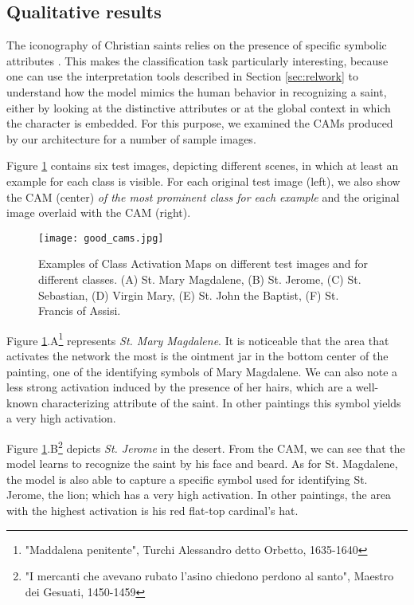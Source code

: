\documentclass[acmlarge]{acmart}
\begin{document}
\subsection{Qualitative results} \label{sec:qualitative}

The iconography of Christian saints relies on the presence of specific symbolic attributes \cite{Lanzi04}. This makes the classification task particularly interesting, because one can use the interpretation tools described in Section \ref{sec:relwork} to understand how the model mimics the human behavior in recognizing a saint, either by looking at the distinctive attributes or at the global context in which the character is embedded. For this purpose, we examined the CAMs produced by our architecture for a number of sample images.

Figure \ref{figure:good_cams} contains six test images, depicting different scenes, in which at least an example for each class is visible. For each original test image (left), we also show the CAM (center) \textit{of the most prominent class for each example} and the original image overlaid with the CAM (right). 

\begin{figure}[ht]
\texttt{[image: good\_cams.jpg]}
\centering
\caption{Examples of Class Activation Maps on different test images and for different classes. (A) St. Mary Magdalene, (B) St. Jerome, (C) St. Sebastian, (D) Virgin Mary, (E) St. John the Baptist, (F) St. Francis of Assisi.}
\label{figure:good_cams}
\end{figure}

Figure \ref{figure:good_cams}.A\footnote{"Maddalena penitente", Turchi Alessandro detto Orbetto, 1635-1640} represents \textit{St. Mary Magdalene}. It is noticeable that the area that activates the network  the most is the ointment jar in the bottom center of the painting,  one of the identifying symbols of Mary Magdalene. We can also note  a less strong activation induced by the presence of her hairs, which are a well-known characterizing attribute of the saint. In other paintings this symbol yields a very high activation.

Figure \ref{figure:good_cams}.B\footnote{"I mercanti che avevano rubato l'asino chiedono perdono al santo", Maestro dei Gesuati, 1450-1459} depicts \textit{St. Jerome} in the desert. From the CAM, we can see that the model learns to recognize the saint by his face and beard. As for St. Magdalene, the model is also able to capture a specific symbol used for identifying St. Jerome, the lion; which has a very high activation. In other paintings, the area with the highest activation is his red flat-top cardinal's hat.
\end{document}
